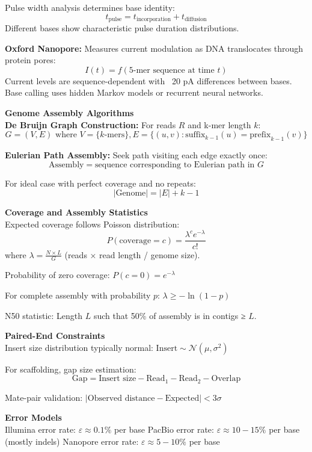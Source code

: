 \begin{technical}
Pulse width analysis determines base identity:
$$
t_{\text{pulse}} = t_{\text{incorporation}} + t_{\text{diffusion}}
$$
Different bases show characteristic pulse duration distributions.

\textbf{Oxford Nanopore:} Measures current modulation as DNA translocates through protein pores:
$$
I(t) = f(\text{5-mer sequence at time } t)
$$
Current levels are sequence-dependent with ~20 pA differences between bases. Base calling uses hidden Markov models or recurrent neural networks.

\textbf{Genome Assembly Algorithms}\\[0.5em]

\textbf{De Bruijn Graph Construction:} For reads $R$ and k-mer length $k$:
$$
G = (V, E) \text{ where } V = \{k\text{-mers}\}, E = \{(u,v) : \text{suffix}_{k-1}(u) = \text{prefix}_{k-1}(v)\}
$$

\textbf{Eulerian Path Assembly:} Seek path visiting each edge exactly once:
$$
\text{Assembly} = \text{sequence corresponding to Eulerian path in } G
$$

For ideal case with perfect coverage and no repeats:
$$
|\text{Genome}| = |E| + k - 1
$$

\textbf{Coverage and Assembly Statistics}\\[0.5em]
Expected coverage follows Poisson distribution:
$$
P(\text{coverage} = c) = \frac{\lambda^c e^{-\lambda}}{c!}
$$
where $\lambda = \frac{N \times L}{G}$ (reads × read length / genome size).

Probability of zero coverage: $P(c = 0) = e^{-\lambda}$

For complete assembly with probability $p$: $\lambda \geq -\ln(1-p)$

N50 statistic: Length $L$ such that 50\% of assembly is in contigs ≥ $L$.

\textbf{Paired-End Constraints}\\[0.5em]
Insert size distribution typically normal: $\text{Insert} \sim \mathcal{N}(\mu, \sigma^2)$

For scaffolding, gap size estimation:
$$
\text{Gap} = \text{Insert size} - \text{Read}_1 - \text{Read}_2 - \text{Overlap}
$$

Mate-pair validation: $|\text{Observed distance} - \text{Expected}| < 3\sigma$

\textbf{Error Models}\\[0.5em]
Illumina error rate: $\varepsilon \approx 0.1\%$ per base
PacBio error rate: $\varepsilon \approx 10-15\%$ per base (mostly indels)
Nanopore error rate: $\varepsilon \approx 5-10\%$ per base


\end{technical}
